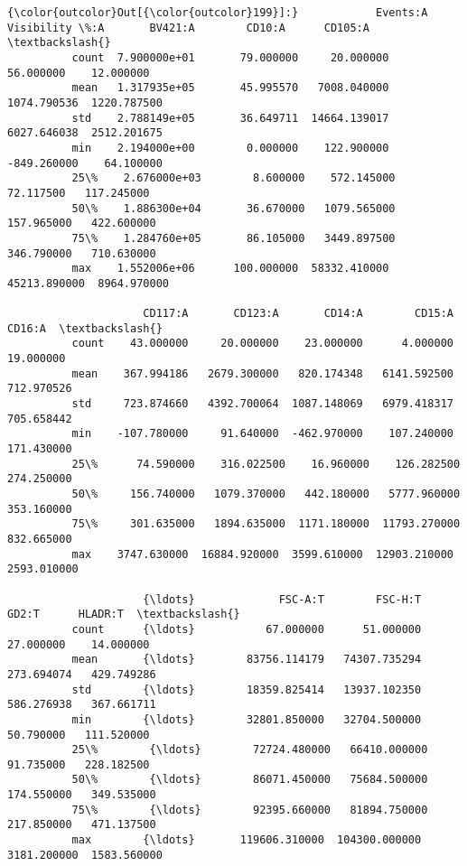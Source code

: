 \documentclass[11pt]{article}
\begin{document}
\begin{Verbatim}[commandchars=\\\{\}]
{\color{outcolor}Out[{\color{outcolor}199}]:}            Events:A  Visibility \%:A       BV421:A        CD10:A      CD105:A  \textbackslash{}
          count  7.900000e+01       79.000000     20.000000     56.000000    12.000000   
          mean   1.317935e+05       45.995570   7008.040000   1074.790536  1220.787500   
          std    2.788149e+05       36.649711  14664.139017   6027.646038  2512.201675   
          min    2.194000e+00        0.000000    122.900000   -849.260000    64.100000   
          25\%    2.676000e+03        8.600000    572.145000     72.117500   117.245000   
          50\%    1.886300e+04       36.670000   1079.565000    157.965000   422.600000   
          75\%    1.284760e+05       86.105000   3449.897500    346.790000   710.630000   
          max    1.552006e+06      100.000000  58332.410000  45213.890000  8964.970000   
          
                     CD117:A       CD123:A       CD14:A        CD15:A       CD16:A  \textbackslash{}
          count    43.000000     20.000000    23.000000      4.000000    19.000000   
          mean    367.994186   2679.300000   820.174348   6141.592500   712.970526   
          std     723.874660   4392.700064  1087.148069   6979.418317   705.658442   
          min    -107.780000     91.640000  -462.970000    107.240000   171.430000   
          25\%      74.590000    316.022500    16.960000    126.282500   274.250000   
          50\%     156.740000   1079.370000   442.180000   5777.960000   353.160000   
          75\%     301.635000   1894.635000  1171.180000  11793.270000   832.665000   
          max    3747.630000  16884.920000  3599.610000  12903.210000  2593.010000   
          
                     {\ldots}             FSC-A:T        FSC-H:T        GD2:T      HLADR:T  \textbackslash{}
          count      {\ldots}           67.000000      51.000000    27.000000    14.000000   
          mean       {\ldots}        83756.114179   74307.735294   273.694074   429.749286   
          std        {\ldots}        18359.825414   13937.102350   586.276938   367.661711   
          min        {\ldots}        32801.850000   32704.500000    50.790000   111.520000   
          25\%        {\ldots}        72724.480000   66410.000000    91.735000   228.182500   
          50\%        {\ldots}        86071.450000   75684.500000   174.550000   349.535000   
          75\%        {\ldots}        92395.660000   81894.750000   217.850000   471.137500   
          max        {\ldots}       119606.310000  104300.000000  3181.200000  1583.560000   
          

\end{Verbatim}
\end{document}
